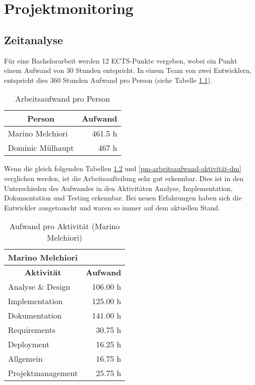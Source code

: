 \chapter{Projektmonitoring}
\label{pm-projektmonitoring}

\section{Zeitanalyse}
\label{pm-zeitanalyse}
Für eine Bachelorarbeit werden 12 ECTS-Punkte vergeben, wobei ein Punkt einem Aufwand von 30 Stunden entspricht.
In einem Team von zwei Entwicklern, entspricht dies 360 Stunden Aufwand pro Person (siehe Tabelle \ref{pm-arbeitsaufwand}).

\begin{table}[H]
\centering
\label{pm-arbeitsaufwand}
\begin{tabular}{|l|r|}
\hline 
\multicolumn{1}{|c|}{\textbf{Person}} & \multicolumn{1}{|c|}{\textbf{Aufwand}} \\
\hline 
Marino Melchiori & 461.5 h \\
\hline 
Dominic Mülhaupt & 467 h \\  
\hline 
\end{tabular}
\caption{Arbeitsaufwand pro Person}
\end{table}

Wenn die gleich folgenden Tabellen \ref{pm-arbeitsaufwand-aktivität-mm} und \ref{pm-arbeitsaufwand-aktivität-dm} verglichen werden, ist die Arbeitsaufteilung sehr gut erkennbar. 
Dies ist in den Unterschieden des Aufwandes in den Aktivitäten Analyse, Implementation, Dokumentation und Testing erkennbar. 
Bei neuen Erfahrungen haben sich die Entwickler ausgetauscht und waren so immer auf dem aktuellen Stand. 

\begin{table}[H]
\centering
\begin{tabular}{|l|r|}
\hline
\multicolumn{2}{|l|}{\textbf{Marino Melchiori}} \\
\hline
\multicolumn{1}{|c|}{\textbf{Aktivität}} & \multicolumn{1}{|c|}{\textbf{Aufwand}} \\
\hline
Analyse \& Design & 106.00 h \\
\hline
Implementation & 125.00 h \\
\hline
Dokumentation & 141.00 h \\
\hline
Requirements & 30.75 h \\
\hline
Deployment & 16.25 h \\
\hline
Allgemein & 16.75 h \\
\hline
Projektmanagement & 25.75 h \\
\hline
\end{tabular}
\caption{Aufwand pro Aktivität (Marino Melchiori)}\label{pm-arbeitsaufwand-aktivität-mm}
\end{table}

